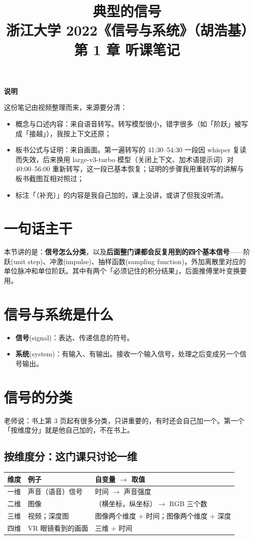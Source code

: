 \documentclass[UTF8,a4paper,11pt]{ctexart}
\title{典型的信号\\\large 浙江大学 2022《信号与系统》（胡浩基）第 1 章 听课笔记}
\author{}
\date{}
\newenvironment{note}{\begin{notebox}\textbf{说明}\par\smallskip}{\end{notebox}}
\begin{document}
\maketitle

\begin{note}
这份笔记由视频整理而来，来源要分清：
\begin{itemize}[nosep]
\item 概念与口述内容：来自语音转写。转写模型很小，错字很多（如「阶跃」被写成「接越」），我按上下文还原；
\item 板书公式与证明：来自画面。第一遍转写的 41:30--54:30 一段因 whisper 复读而失效，后来换用 large-v3-turbo 模型（关闭上下文、加术语提示词）对 40:00--56:00 重新转写，这一段已基本恢复；证明的步骤我用重转写的讲解与板书截图互相对照过；
\item 标注「（补充）」的内容是我自己加的，课上没讲，或讲了但我没听清。
\end{itemize}
\end{note}

\section{一句话主干}
本节讲的是：\textbf{信号怎么分类}，以及\textbf{后面整门课都会反复用到的四个基本信号}——阶跃(unit step)、冲激(impulse)、抽样函数(sampling function)，外加离散里对应的单位脉冲和单位阶跃。其中有两个「必须记住的积分结果」，后面推傅里叶变换要用。

\section{信号与系统是什么}
\begin{itemize}
\item \textbf{信号}(signal)：表达、传递信息的符号。
\item \textbf{系统}(system)：有输入、有输出。接收一个输入信号，处理之后变成另一个信号输出。
\end{itemize}

\section{信号的分类}
老师说：书上第 3 页起有很多分类，只讲重要的，有时还会自己加一个。第一个「按维度分」就是他自己加的，不在书上。

\subsection{按维度分：这门课只讨论一维}
\begin{tabular}{@{}lll@{}}
\toprule
维度 & 例子 & 自变量 $\to$ 取值 \\
\midrule
一维 & 声音（语音）信号 & 时间 $\to$ 声音强度 \\
二维 & 图像 & （横坐标，纵坐标）$\to$ RGB 三个数 \\
三维 & 视频；深度图 & 图像两个维度 $+$ 时间；图像两个维度 $+$ 深度 \\
四维 & VR 眼镜看到的画面 & 三维 $+$ 时间 \\
\bottomrule
\end{tabular}
\end{document}
